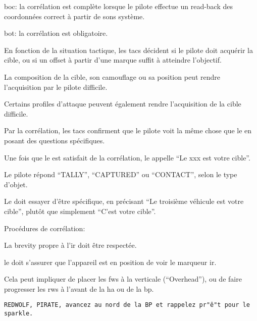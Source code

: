 	
\begin{e1}
	
	\item \gls{boc}: la corrélation est complète lorsque le pilote effectue un read-back des coordonnées correct à partir de sons système.
	
	\item \gls{bot}: la corrélation est obligatoire.
	
	En fonction de la situation tactique, les \glspl{tac} décident si le pilote doit acquérir la cible, ou si un offset à partir d'une marque suffit à atteindre l'objectif.
	
	La composition de la cible, son camouflage ou sa position peut rendre l'acquisition par le pilote difficile.
	
	Certains profiles d'attaque peuvent également rendre l'acquisition de la cible difficile.
	
	Par la corrélation, les \glspl{tac} confirment que le pilote voit la même chose que le \ja{} en posant des questions spécifiques.
	
	\item Une fois que le \ja{} est satisfait de la corrélation, le \ja{} appelle ``Le xxx est votre cible''.
	
	Le pilote répond ``TALLY'', ``CAPTURED'' ou ``CONTACT'', selon le type d'objet.
	
	Le \ja{} doit essayer d'être spécifique, en précisant ``Le troisième véhicule est votre cible'', plutôt que simplement ``C'est votre cible''.
	
	\item Procédures de corrélation:
	
	\begin{e2}
		
		
		
		\begin{e3}
			
			\item La brevity propre à l'\gls{ir} doit être respectée.
			
			\begin{minipage}{\linewidth}
				
				\item le \ja{} doit s'assurer que l'appareil est en position de voir le marqueur \gls{ir}.
				
				Cela peut impliquer de placer les \glspl{fw} à la verticale (``Overhead''), ou de faire progresser les \glspl{rw} à l'avant de la \gls{ha} ou de la \gls{bp}.
				\begin{lstlisting}[caption=Corrélation Math Sparkle, label=9lsparkle]
	REDWOLF, PIRATE, avancez au nord de la BP et rappelez pr"ê"t pour le sparkle.
				\end{lstlisting}
			\end{minipage}
			

\end{e3}
\end{e2}
\end{e1}
